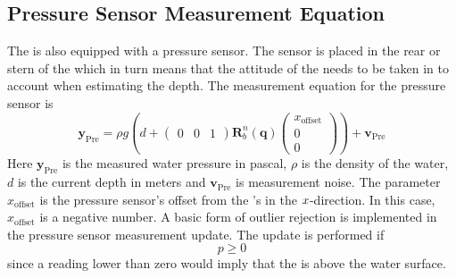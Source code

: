 \subsection{Pressure Sensor Measurement Equation}
The \abbrROV is also equipped with a pressure sensor. The sensor is placed in the rear or stern of the \abbrROV which in turn means that the attitude of the \abbrROV needs to be taken in to account when estimating the depth.
The measurement equation for the pressure sensor is
\begin{equation}
 \boldsymbol{y}_{\text{Pre}}=  \rho g \left(d + \begin{pmatrix}
    0 & 0 & 1
\end{pmatrix} \boldsymbol{R}^n_b(\boldsymbol{q}) 
\begin{pmatrix}
x_{\text{offset}}\\
0\\
0
\end{pmatrix}\right)
    + \boldsymbol{v}_{\text{Pre}}
\end{equation}
Here $\boldsymbol{y}_{\text{Pre}}$ is the measured water pressure in pascal, $\rho$ is the density of the water, $d$ is the current depth in meters and $\boldsymbol{v}_{\text{Pre}}$ is measurement noise. The parameter $x_{\text{offset}}$ is the pressure sensor's offset from the \abbrROV's \abbrCO in the $x$-direction. In this case, $x_{\textrm{offset}}$ is a negative number. A basic form of outlier rejection is implemented in the pressure sensor measurement update. The update is performed if
\begin{equation}
    p \geq 0
\end{equation}
since a reading lower than zero would imply that the \abbrROV is above the water surface.